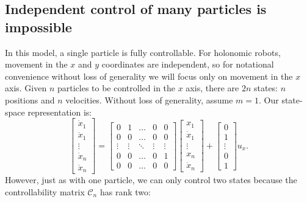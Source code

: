 \subsection{Independent control of many particles is impossible}
In this model, a single particle is fully controllable. For holonomic robots, movement in the $x$ and $y$ coordinates are independent, so for notational convenience without loss of generality we will focus only on movement in the $x$ axis. Given $n$ particles to be  controlled in the $x$ axis, there are $2n$ states: $n$ positions and $n$ velocities. Without loss of generality, assume $m=1$.
Our state-space representation is:
\begin{equation}
\begin{bmatrix}
\dot{x}_{1}\\ 
\ddot{x}_{1}\\
\vdots\\
\dot{x}_{n}\\
\ddot{x}_{n}

\end{bmatrix} = \begin{bmatrix}
0 & 1 & \ldots & 0 & 0 \\
0 & 0 & \ldots& 0 & 0 \\
\vdots &  \vdots & \ddots & \vdots & \vdots \\
0 & 0  & \ldots & 0 & 1 \\
0 & 0 & \ldots& 0 & 0 
\end{bmatrix}  \begin{bmatrix}
x_{1}\\
\dot{x}_{1}\\
\vdots \\
x_{n}\\
\dot{x}_{n}
\end{bmatrix} + \begin{bmatrix}
0\\
1\\
\vdots\\
0\\
1
\end{bmatrix} u_x.
\end{equation}
 However, just as with one particle, we can only control two states because the controllability matrix $\mathcal{C}_n$ has rank two:
